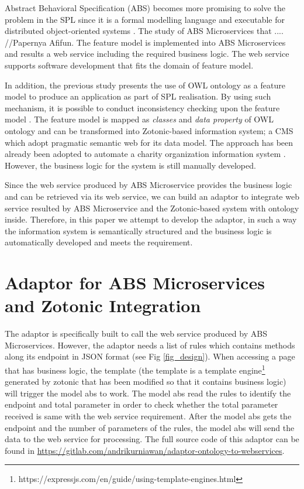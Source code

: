 \documentclass[conference]{IEEEtran}
\begin{document}
Abstract Behavioral Specification (ABS) becomes more promising to solve the problem in the SPL since it is a formal modelling language and executable for distributed object-oriented systems \cite{ABS} \cite{ABSTutorial}. The study of ABS Microservices that .... //Papernya Afifun. The feature model is implemented into ABS Microservices and results a web service including the required business logic. The web service supports software development that fits the domain of feature model.

In addition, the previous study \cite{fmontology} presents the use of OWL ontology as a feature model to produce an application as part of SPL realisation. By using such mechanism, it is possible to conduct inconsistency checking upon the feature model \cite{verify}. The feature model is mapped as \textit{classes} and \textit{data property} of OWL ontology and can be transformed into Zotonic-based information system; a CMS which adopt pragmatic semantic web for its data model. The approach has been already been adopted to automate a charity organization information system \cite{bravyto}. However, the business logic for the system is still manually developed.

Since the web service produced by ABS Microservice provides the business logic and can be retrieved via its web service, we can build an adaptor to integrate web service resulted by ABS Microservice and the Zotonic-based system with ontology inside. Therefore, in this paper we attempt to develop the adaptor, in such a way the information system is semantically structured and the business logic is automatically developed and meets the requirement.

\section{Adaptor for ABS Microservices and Zotonic Integration} 
The adaptor is specifically built to call the web service produced by ABS Microservices. However, the adaptor needs a list of rules which contains methods along its endpoint in JSON format (see Fig \ref{fig_design}). When accessing a page that has business logic, the template (the template is a template engine\footnote{https://expressjs.com/en/guide/using-template-engines.html} generated by zotonic that has been modified so that it contains business logic) will trigger the model abs to work. The model abs read the rules to identify the endpoint and total parameter in order to check whether the total parameter received is same with the web service requirement. After the model abs gets the endpoint and the number of parameters of the rules, the model abs will send the data to the web service for processing. The full source code of this adaptor can be found in \url{https://gitlab.com/andrikurniawan/adaptor-ontology-to-webservices}.
\end{document}
